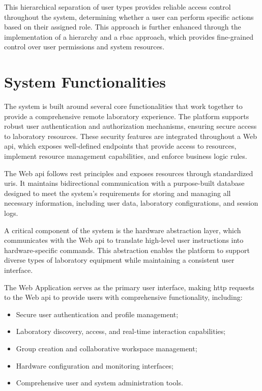 This hierarchical separation of user types provides reliable access control throughout the system, determining whether a user can perform specific actions based on their assigned role. This approach is further enhanced through the implementation of a hierarchy and a \ac{rbac} approach, which provides fine-grained control over user permissions and system resources.

\section{System Functionalities}\label{sec:system_functionalities}
The system is built around several core functionalities that work together to provide a comprehensive remote laboratory experience. The platform supports robust user authentication and authorization mechanisms, ensuring secure access to laboratory resources. These security features are integrated throughout a Web \acs{api}, which exposes well-defined endpoints that provide access to resources, implement resource management capabilities, and enforce business logic rules.

The Web \acs{api} follows \ac{rest} principles and exposes resources through standardized \acp{uri}. It maintains bidirectional communication with a purpose-built database designed to meet the system's requirements for storing and managing all necessary information, including user data, laboratory configurations, and session logs.

A critical component of the system is the hardware abstraction layer, which communicates with the Web \ac{api} to translate high-level user instructions into hardware-specific commands. This abstraction enables the platform to support diverse types of laboratory equipment while maintaining a consistent user interface.

The Web Application serves as the primary user interface, making \ac{http} requests to the Web \ac{api} to provide users with comprehensive functionality, including:

\begin{itemize}
    \item Secure user authentication and profile management;
    \item Laboratory discovery, access, and real-time interaction capabilities;
    \item Group creation and collaborative workspace management;
    \item Hardware configuration and monitoring interfaces;
    \item Comprehensive user and system administration tools.
\end{itemize}

